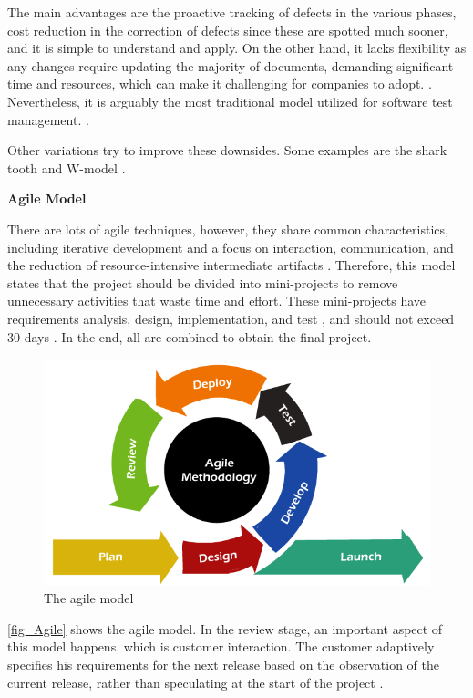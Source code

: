 The main advantages are the proactive tracking of defects in the various phases, cost reduction in the correction of defects since these are 
spotted much sooner, and it is simple to understand and apply. On the other hand, it lacks flexibility as any changes require updating the majority 
of documents, demanding significant time and resources, which can make it challenging for companies to adopt. \cite{V-model} \cite{V-model2}. 
Nevertheless, it is arguably the most traditional model utilized for software test management. \cite{mathur2010advancements}.

Other variations try to improve these downsides. Some examples are the shark tooth and W-model \cite{V-model2}.
\newline

\textbf{Agile Model}
\newline

There are lots of agile techniques, however, they share common characteristics, including iterative development and a focus on interaction, 
communication, and the reduction of resource-intensive intermediate artifacts \cite{waterfallAndAgile}. Therefore, this model states that the 
project should be divided into mini-projects to remove unnecessary activities that waste time and effort. These mini-projects have requirements 
analysis, design, implementation, and test \cite{waterfallAndAgile}, and should not exceed 30 days \cite{AgileModel}. In the end, all are 
combined to obtain the final project.

\begin{figure}[H]
	\centering
 	\includegraphics[width=0.5\linewidth]{Images/agileModel.png}
 	\caption{The agile model}
	 \label{fig_Agile}
\end{figure}

\autoref{fig_Agile} shows the agile model. In the review stage, an important aspect of this model happens, which is customer interaction. 
The customer adaptively specifies his requirements for the next release based on the observation of the current release, rather than speculating 
at the start of the project \cite{SpiralModel}. 
\newline

